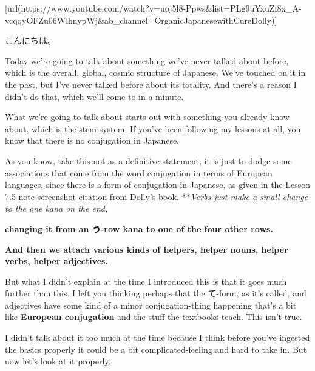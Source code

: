 \startsectionlevel[title={{\bf 81. Global principle of all Japanese word-forms.}},reference={global-principle-of-all-japanese-word-forms.}]

[url(https://www.youtube.com/watch?v=uoj5l8-Ppws&list=PLg9uYxuZf8x_A-vcqqyOFZu06WlhnypWj&ab_channel=OrganicJapanesewithCureDolly)]

こんにちは。

Today we're going to talk about something we've never talked about before, which is the overall, global, cosmic structure of Japanese. We've touched on it in the past, but I've never talked before about its totality. And there's a reason I didn't do that, which we'll come to in a minute.

What we're going to talk about starts out with something you already know about, which is the stem system. If you've been following my lessons at all, you know that there is no conjugation in Japanese.

{}

As you know, take this not as a definitive statement, it is just to dodge some associations that come from the word conjugation in terms of European languages, since there is a form of conjugation in Japanese, as given in the Lesson 7.5 note screenshot citation from Dolly's book. **{\em Verbs just make a small change to the one kana on the end,}

{\bf changing it from an う-row kana to one of the four other rows.}

{\bf And then we attach various kinds of helpers, helper nouns, helper verbs, helper adjectives.}

{}

But what I didn't explain at the time I introduced this is that it goes much further than this. I left you thinking perhaps that the て-form, as it's called, and adjectives have some kind of a minor conjugation-thing happening that's a bit like {\bf European conjugation} and the stuff the textbooks teach. This isn't true.

I didn't talk about it too much at the time because I think before you've ingested the basics properly it could be a bit complicated-feeling and hard to take in. But now let's look at it properly.

\startsectionlevel[title={Active & Static/Inert words},reference={active-staticinert-words}]

